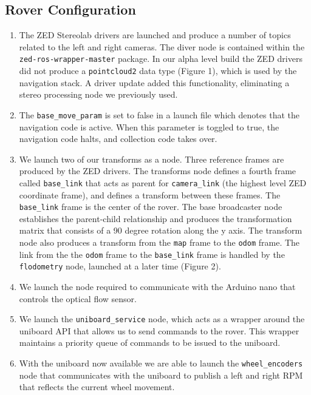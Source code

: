 \documentclass[10pt, oneside,onecolumn]{IEEEtran}
\begin{document}
\begin{titlepage}
\subsection{Rover Configuration}
\begin{enumerate}
\item The ZED Stereolab drivers are launched and produce a number of topics related to the left and right cameras. The diver node is contained within the \texttt{zed-ros-wrapper-master} package. In our alpha level build the ZED drivers did not produce a \texttt{pointcloud2} data type (Figure 1), which is used by the navigation stack. A driver update added this functionality, eliminating a stereo processing node we previously used.

\item The \texttt{base\_move\_param} is set to false in a launch file which denotes that the navigation code is active. When this parameter is toggled to true, the navigation code halts, and collection code takes over. 

\item We launch two of our transforms as a node. Three reference frames are produced by the ZED drivers. The transforms node defines a fourth frame called \texttt{base\_link} that acts as parent for \texttt{camera\_link} (the highest level ZED coordinate frame), and defines a transform between these frames. The \texttt{base\_link} frame is the center of the rover. The base broadcaster node establishes the parent-child relationship and produces the transformation matrix that consists of a 90 degree rotation along the y axis. The transform node also produces a transform from the \texttt{map} frame to the \texttt{odom} frame. The link from the the \texttt{odom} frame to the \texttt{base\_link} frame is handled by the \texttt{flodometry} node, launched at a later time (Figure 2).

\item We launch the node required to communicate with the Arduino nano that controls the optical flow sensor. 

\item We launch the \texttt{uniboard\_service} node, which acts as a wrapper around the uniboard API that allows us to send commands to the rover. This wrapper maintains a priority queue of commands to be issued to the uniboard. 

\item With the uniboard now available we are able to launch the \texttt{wheel\_encoders} node that communicates with the uniboard to publish a left and right RPM that reflects the current wheel movement.


\end{enumerate}
\end{titlepage}
\end{document}
